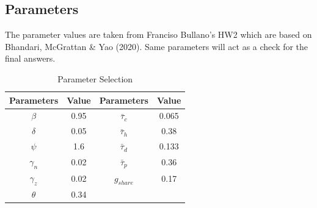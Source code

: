 \documentclass[12pt]{article}
\begin{document}
\subsection{Parameters}
The parameter values are taken from Franciso Bullano's HW2 which are based on Bhandari, McGrattan \& Yao (2020). Same parameters will act as a check for the final answers. 


\begin{center}
\begin{table}[h]
\centering
\begin{tabular}{| c | c | c | c | }
\hline
\textbf{Parameters} & \textbf{Value} & \textbf{Parameters} & \textbf{Value} \\
\hline
$\beta$ & 0.95 & $\bar\tau_c$ & 0.065\\
\hline
$\delta$ & 0.05 & $\bar\tau_h$ & 0.38\\
\hline
$\psi$ & 1.6  &  $\bar\tau_d$ & 0.133\\
\hline
$\gamma_n$ & 0.02 & $\bar\tau_p$ & 0.36\\
\hline
$\gamma_z$ & 0.02 & $g_{share}$ & 0.17\\
\hline
$\theta$ & 0.34 & &\\
\hline
\end{tabular}
\caption{Parameter Selection}
\end{table}
\end{center}
\end{document}
